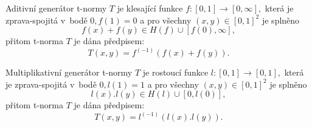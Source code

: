 \begin{definition}
    \cite{KMP}
    Aditivní generátor t-normy $T$ je klesající funkce
    $f:[0,1] \rightarrow [0,\infty],$ která je zprava-spojitá v~bodě $0,
    f(1)=0$
    a pro všechny $(x,y) \in [0,1]^2$ je splněno
    $$f(x)+f(y) \in H(f) \cup [f(0),\infty],$$
    přitom t-norma $T$ je dána předpisem:
    $$T(x,y)=f^{(-1)}(f(x)+f(y)).$$
\end{definition}
\begin{definition}
    \cite{KMP}
    Multiplikativní generátor t-normy $T$ je rostoucí funkce
    $l:[0,1] \rightarrow [0,1],$ která je zprava-spojitá v~bodě $0, l(1)=1$
    a pro všechny $(x,y) \in [0,1]^2$ je splněno
    $$l(x).l(y) \in H(l) \cup [0,l(0)],$$
    přitom t-norma $T$ je dána předpisem:
    $$T(x,y)=l^{(-1)}(l(x).l(y)).$$
\end{definition}


